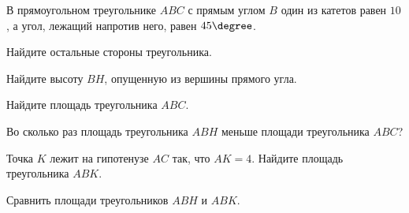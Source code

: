 \begin{ex}
	\begin{condition}
		В прямоугольном треугольнике \( ABC \) с прямым углом \( B \) один из катетов равен \( 10 \), а угол, лежащий напротив него, равен \( 45\degree \).
		\begin{enumcols}[label=\arabic*)]
			\item Найдите остальные стороны треугольника.
			\item Найдите высоту \( BH \), опущенную из вершины прямого угла.
			\item Найдите площадь треугольника \( ABC \).
			\item Во сколько раз площадь треугольника \( ABH \) меньше площади треугольника \( ABC \)?
			\item Точка \( K \) лежит на гипотенузе \( AC \) так, что \( AK=4 \). Найдите площадь треугольника \( ABK \).
			\item Сравнить площади треугольников \( ABH \) и \( ABK \).
		\end{enumcols}
	\end{condition}
\end{ex}